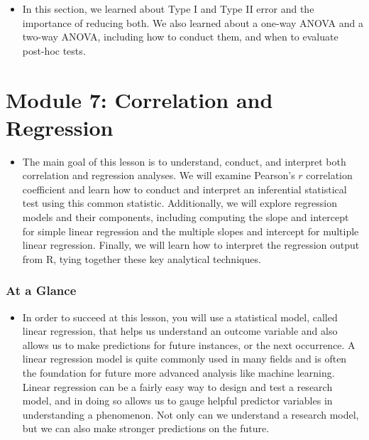 \documentclass[
  letterpaper,
  DIV=11,
  numbers=noendperiod]{scrreprt}
\providecommand{\tightlist}{%
  \setlength{\itemsep}{0pt}\setlength{\parskip}{0pt}}\usepackage{longtable,booktabs,array}
\begin{document}
\begin{itemize}
\tightlist
\item
  In this section, we learned about Type I and Type II error and the
  importance of reducing both. We also learned about a one-way ANOVA and
  a two-way ANOVA, including how to conduct them, and when to evaluate
  post-hoc tests.
\end{itemize}


\chapter{Module 7: Correlation and
Regression}\label{module-7-correlation-and-regression}

\begin{itemize}
\tightlist
\item
  The main goal of this lesson is to understand, conduct, and interpret
  both correlation and regression analyses. We will examine Pearson's
  \(r\) correlation coefficient and learn how to conduct and interpret
  an inferential statistical test using this common statistic.
  Additionally, we will explore regression models and their components,
  including computing the slope and intercept for simple linear
  regression and the multiple slopes and intercept for multiple linear
  regression. Finally, we will learn how to interpret the regression
  output from R, tying together these key analytical techniques.
\end{itemize}

\subsection{At a Glance}\label{at-a-glance-6}

\begin{itemize}
\tightlist
\item
  In order to succeed at this lesson, you will use a statistical model,
  called linear regression, that helps us understand an outcome variable
  and also allows us to make predictions for future instances, or the
  next occurrence. A linear regression model is quite commonly used in
  many fields and is often the foundation for future more advanced
  analysis like machine learning. Linear regression can be a fairly easy
  way to design and test a research model, and in doing so allows us to
  gauge helpful predictor variables in understanding a phenomenon. Not
  only can we understand a research model, but we can also make stronger
  predictions on the future.
\end{itemize}
\end{document}
